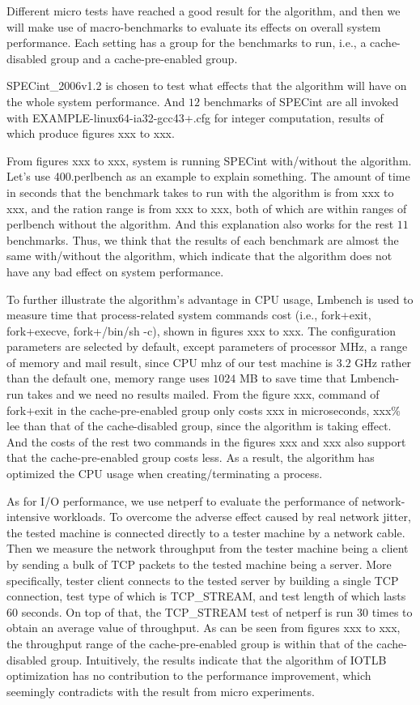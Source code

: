 \documentclass[letterpaper,twocolumn,10pt]{article}
\begin{document}
Different micro tests have reached a good result for the algorithm, and then we will make use of macro-benchmarks to evaluate its effects on overall system performance. Each setting has a group for the benchmarks to run, i.e., a cache-disabled group and a cache-pre-enabled group.

SPECint\_2006v1.2 is chosen to test what effects that the algorithm will have on the whole system performance. And $12$ benchmarks of SPECint are all invoked with EXAMPLE-linux64-ia32-gcc43+.cfg for integer computation, results of which produce figures xxx to xxx.

From figures xxx to xxx, system is running SPECint with/without the algorithm. Let’s use 400.perlbench as an example to explain something. The amount of time in seconds that the benchmark takes to run with the algorithm is from xxx to xxx, and the ration range is from xxx to xxx, both of which are within ranges of perlbench without the algorithm. And this explanation also works for the rest $11$ benchmarks. Thus, we think that the results of each benchmark are almost the same with/without the algorithm, which indicate that the algorithm does not have any bad effect on system performance.

To further illustrate the algorithm’s advantage in CPU usage, Lmbench is used to measure time that process-related system commands cost (i.e., fork+exit, fork+execve, fork+/bin/sh -c), shown in figures xxx to xxx. The configuration parameters are selected by default, except parameters of processor MHz, a range of memory and mail result, since CPU mhz of our test machine is $3.2$ GHz rather than the default one, memory range uses $1024$ MB to save time that Lmbench-run takes and we need no results mailed.
From the figure xxx, command of fork+exit in the cache-pre-enabled group only costs xxx in microseconds, xxx\% lee than that of the cache-disabled group, since the algorithm is taking effect. And the costs of the rest two commands in the figures xxx and xxx also support that the cache-pre-enabled group costs less. As a result, the algorithm has optimized the CPU usage when creating/terminating a process.

As for I/O performance, we use netperf to evaluate the performance of network-intensive workloads. To overcome the adverse effect caused by real network jitter, the tested machine is connected directly to a tester machine by a network cable. Then we measure the network throughput from the tester machine being a client by sending a bulk of TCP packets to the tested machine being a server. More specifically, tester client connects to the tested server by building a single TCP connection, test type of which is TCP\_STREAM, and test length of which lasts $60$ seconds. On top of that, the TCP\_STREAM test of netperf is run $30$ times to obtain an average value of throughput. As can be seen from figures xxx to xxx, the throughput range of the cache-pre-enabled group is within that of the cache-disabled group. Intuitively, the results indicate that the algorithm of IOTLB optimization has no contribution to the performance improvement, which seemingly contradicts with the result from micro experiments.
\end{document}
